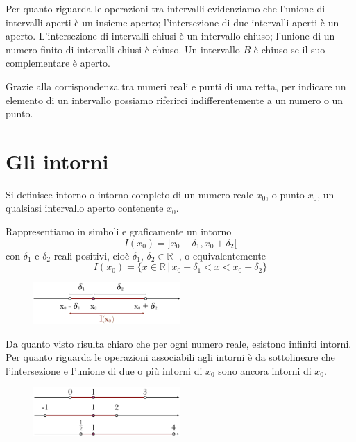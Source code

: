 Per quanto riguarda le operazioni tra intervalli evidenziamo che l'unione di 
intervalli aperti è un insieme aperto; l'intersezione di due intervalli 
aperti è un aperto. L'intersezione di intervalli chiusi è un intervallo 
chiuso; l'unione di un numero finito di intervalli chiusi è chiuso. Un 
intervallo \(B\) è chiuso se il suo complementare è aperto.

Grazie alla corrispondenza tra numeri reali e punti di una retta, per 
indicare un elemento di un intervallo possiamo riferirci indifferentemente a 
un numero o un punto.

\section{Gli intorni}
  \begin{definizione}
Si definisce intorno o intorno completo di un numero reale \(x_0\), o punto 
\(x_0\), un qualsiasi intervallo aperto contenente \(x_0\).
  \end{definizione}

Rappresentiamo in simboli e graficamente un intorno
\begin{equation}
I(x_0)=]x_0-\delta_1,x_0+\delta_2[
\end{equation}
con \(\delta_1\) e \(\delta_2\) reali positivi, cioè 
\(\delta_1,\,\delta_2 \in \mathbb{R^+}\), o equivalentemente
\begin{equation}
I(x_0)=\{x\in \mathbb{R}\,\vert\,x_0-\delta_1<x<x_0+\delta_2\}
\end{equation}

  \begin{figure}[h!]
  \centering
  
\includegraphics[width=0.5\textwidth]{img/top_1.png}%
  \end{figure}
  
Da quanto visto risulta chiaro che per ogni numero reale, esistono infiniti 
intorni.\\
Per quanto riguarda le operazioni associabili agli intorni è da sottolineare 
che l'intersezione e l'unione di due o più intorni di \(x_0\) sono ancora 
intorni di \(x_0\).

\begin{figure}[h!]
\centering
\includegraphics[width=0.5\textwidth]{img/top_7.png}%
  \end{figure}
  
